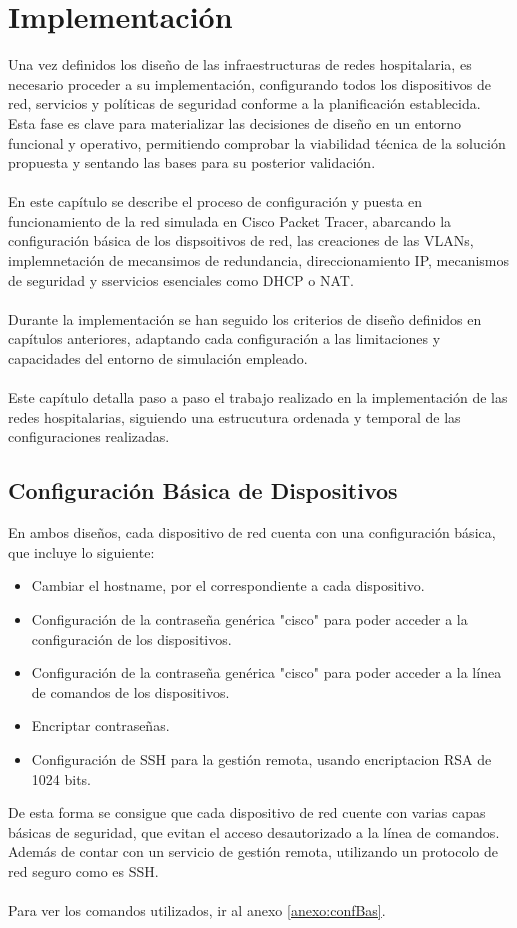
\chapter{Implementación}\label{Implementación}
Una vez definidos los diseño de las infraestructuras de redes hospitalaria, es necesario proceder a su implementación, configurando todos los dispositivos de red, servicios y políticas de seguridad conforme a la planificación establecida. Esta fase es clave para materializar las decisiones de diseño en un entorno funcional y operativo, permitiendo comprobar la viabilidad técnica de la solución propuesta y sentando las bases para su posterior validación.
\\ \\
En este capítulo se describe el proceso de configuración y puesta en funcionamiento de la red simulada en Cisco Packet Tracer, abarcando la configuración básica de los dispsoitivos de red, las creaciones de las VLANs, implemnetación de mecansimos de redundancia, direccionamiento IP, mecanismos de seguridad y sservicios esenciales como DHCP o NAT.
\\ \\
Durante la implementación se han seguido los criterios de diseño definidos en capítulos anteriores, adaptando cada configuración a las limitaciones y capacidades del entorno de simulación empleado.
\\ \\
Este capítulo detalla paso a paso el trabajo realizado en la implementación de las redes hospitalarias, siguiendo una estrucutura ordenada y temporal de las configuraciones realizadas.
\section{Configuración Básica de Dispositivos}
En ambos diseños, cada dispositivo de red cuenta con una configuración básica, que incluye lo siguiente:
\begin{itemize}
    \item Cambiar el hostname, por el correspondiente a cada dispositivo.
    \item Configuración de la contraseña genérica "cisco" para poder acceder a la configuración de los dispositivos.
    \item Configuración de la contraseña genérica "cisco" para poder acceder a la línea de comandos de los dispositivos.
    \item Encriptar contraseñas.
    \item Configuración de SSH para la gestión remota, usando encriptacion RSA de 1024 bits.
\end{itemize}
De esta forma se consigue que cada dispositivo de red cuente con varias capas básicas de seguridad, que evitan el acceso desautorizado a la línea de comandos. Además de contar con un servicio de gestión remota, utilizando un protocolo de red seguro como es SSH.
\\ \\
Para ver los comandos utilizados, ir al anexo \ref{anexo:confBas}.

